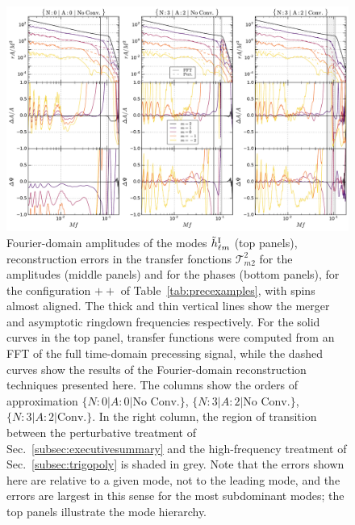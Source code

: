 \documentclass[aps,showpacs,twocolumn,
prd,superscriptaddress,nofootinbib]{revtex4-1}
\newcommand\calT{{\mathcal{T}}}
\begin{document}
\begin{figure}
  \centering
  \includegraphics[width=.98\linewidth]{plots/precerror_++_py.pdf}
  \caption{Fourier-domain amplitudes of the modes $\tilde{h}^{\rm I}_{\ell m}$ (top panels), reconstruction errors in the transfer fonctions $\calT^{2}_{m2}$ for the amplitudes (middle panels) and for the phases (bottom panels),  for the configuration $++$ of Table~\ref{tab:precexamples}, with spins almost aligned. The thick and thin vertical lines show the merger and asymptotic ringdown frequencies respectively. For the solid curves in the top panel, transfer functions were computed from an FFT of the full time-domain precessing signal, while the dashed curves show the results of the Fourier-domain reconstruction techniques presented here. The columns show the orders of approximation $\{N:0 | A:0 | \text{No Conv.}\}$, $\{N:3 | A:2 | \text{No Conv.}\}$, $\{N:3 | A:2 | \text{Conv.}\}$. In the right column, the region of transition between the perturbative treatment of Sec.~\ref{subsec:executivesummary} and the high-frequency treatment of Sec.~\ref{subsec:trigopoly} is shaded in grey. Note that the errors shown here are relative to a given mode, not to the leading mode, and the errors are largest in this sense for the most subdominant modes; the top panels illustrate the mode hierarchy.}
  \label{fig:precerrors++}
\end{figure}
\end{document}
